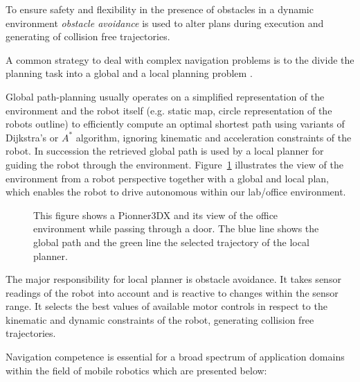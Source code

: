 To ensure safety and flexibility in the presence of obstacles in a dynamic environment \emph{obstacle avoidance} is used to alter plans during execution and generating of collision free trajectories.

A common strategy to deal with complex navigation problems is to the divide the planning task into a global and a local planning problem \cite{LaValle2006}.

Global path-planning usually operates on a simplified representation of the environment and the robot itself (e.g. static map, circle representation of the robots outline) to efficiently compute an optimal shortest path using variants of Dijkstra's \cite{dijkstra1959note} or $A^*$ \cite{DBLP:journals/tssc/HartNR68/Astar} algorithm, ignoring kinematic and acceleration constraints of the robot.
In succession the retrieved global path is used by a local planner for guiding the robot through the environment.
Figure~\ref{fig:fig_pioneer} illustrates the view of the environment from a robot perspective together with a global and local plan, which enables the robot to drive autonomous within our lab/office environment.

\begin{figure}[thpb]
      \centering
      \def\svgwidth{\textwidth}
      
      \caption[Global and local planning.]{This figure shows a Pionner3DX and its view of the office environment while passing through a door. The blue line shows the global path and the green line the selected trajectory of the local planner.}
      \label{fig:fig_pioneer}
\end{figure}

The major responsibility for local planner is obstacle avoidance. It takes sensor readings of the robot into account and is reactive to changes within the sensor range. 
It selects the best values of available motor controls in respect to the kinematic and dynamic constraints of the robot, generating collision free trajectories. 
   
Navigation competence is essential for a broad spectrum of application domains within the field of mobile robotics which are presented below:

